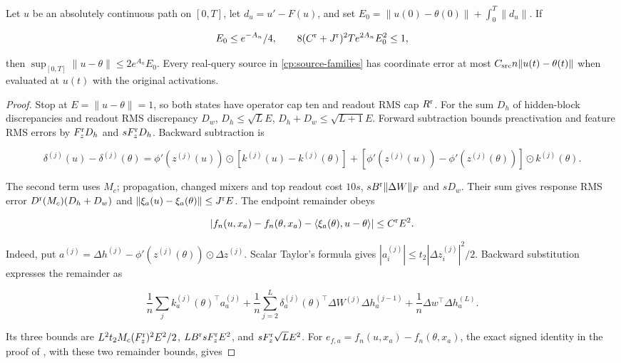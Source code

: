 \begin{lemma}
\label{cp:init:defect}

Let $u$ be an absolutely continuous path on $[0,T]$, let
$d_u=u'-F(u)$, and set
$E_0=\|u(0)-\theta(0)\|+\int_0^T\|d_u\|$.
If

\[
E_0\le e^{-A_n}/4,\qquad
8(C^{\rm r}+J^{\rm r})^2Te^{2A_n}E_0^2\le1,
\]

then $\sup_{[0,T]}\|u-\theta\|\le2e^{A_n}E_0$.
Every real-query source in \eqref{cp:source-families} has coordinate
error at most $C_{\rm src}n\|u(t)-\theta(t)\|$ when evaluated at
$u(t)$ with the original activations.
\end{lemma}

\begin{proof}
Stop at $E=\|u-\theta\|=1$, so both states have operator cap ten
and readout RMS cap $R^{\rm r}$. For the sum $D_h$ of hidden-block
discrepancies and readout RMS discrepancy $D_w$,
$D_h\le\sqrt L E$, $D_h+D_w\le\sqrt{L+1}E$.
Forward subtraction bounds preactivation and feature RMS errors by
$F_z^{\rm r}D_h$ and $sF_z^{\rm r}D_h$. Backward subtraction is

\[
\delta^{(j)}(u)-\delta^{(j)}(\theta)
=\phi'(z^{(j)}(u))\odot[k^{(j)}(u)-k^{(j)}(\theta)]
 +[\phi'(z^{(j)}(u))-\phi'(z^{(j)}(\theta))]\odot k^{(j)}(\theta).
\]

The second term uses $M_c$; propagation, changed mixers and top readout
cost $10s$, $sB^{\rm r}\|\Delta W\|_F$ and $sD_w$.
Their sum gives response RMS error $D^{\rm r}(M_c)(D_h+D_w)$
and $\|\xi_a(u)-\xi_a(\theta)\|\le J^{\rm r}E$.
The endpoint remainder obeys

\[
|f_n(u,x_a)-f_n(\theta,x_a)-\langle\xi_a(\theta),u-\theta\rangle|
 \le C^{\rm r}E^2.
\]

Indeed, put
$a^{(j)}=\Delta h^{(j)}-\phi'(z^{(j)}(\theta))\odot\Delta z^{(j)}$.
Scalar Taylor's formula gives
$|a_i^{(j)}|\le t_2|\Delta z_i^{(j)}|^2/2$.
Backward substitution expresses the remainder as

\[
\frac1n\sum_j k_a^{(j)}(\theta)^\top a_a^{(j)}
 +\frac1n\sum_{j=2}^L\delta_a^{(j)}(\theta)^\top
                  \Delta W^{(j)}\Delta h_a^{(j-1)}
 +\frac1n\Delta w^\top\Delta h_a^{(L)}.
\]

Its three bounds are
$L^2t_2M_c(F_z^{\rm r})^2E^2/2$,
$LB^{\rm r}sF_z^{\rm r}E^2$, and $sF_z^{\rm r}\sqrt L E^2$.
For $e_{f,a}=f_n(u,x_a)-f_n(\theta,x_a)$, the exact signed identity
in the proof of , with these two remainder bounds, gives


\end{proof}
